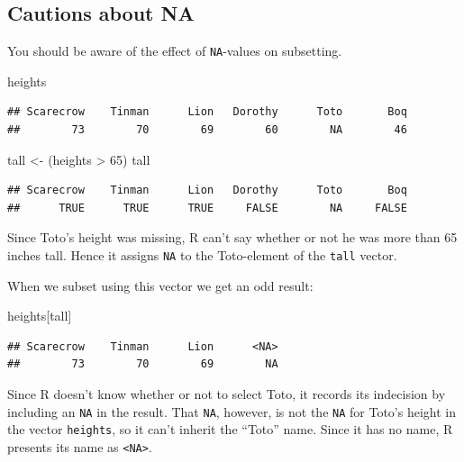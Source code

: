 \documentclass[]{book}
\makeatletter
\newenvironment{Shaded}{\begin{snugshade}}{\end{snugshade}}
\newcommand{\DecValTok}[1]{\textcolor[rgb]{0.00,0.00,0.81}{{#1}}}
\newcommand{\StringTok}[1]{\textcolor[rgb]{0.31,0.60,0.02}{{#1}}}
\newcommand{\NormalTok}[1]{{#1}}
\newenvironment{kframe}{%
\medskip{}
\setlength{\fboxsep}{.8em}
 \def\at@end@of@kframe{}%
 \ifinner\ifhmode%
  \def\at@end@of@kframe{\end{minipage}}%
  \begin{minipage}{\columnwidth}%
 \fi\fi%
 \def\FrameCommand##1{\hskip\@totalleftmargin \hskip-\fboxsep
 \colorbox{shadecolor}{##1}\hskip-\fboxsep
     \hskip-\linewidth \hskip-\@totalleftmargin \hskip\columnwidth}%
 \MakeFramed {\advance\hsize-\width
   \@totalleftmargin\z@ \linewidth\hsize
   \@setminipage}}%
 {\par\unskip\endMakeFramed%
 \at@end@of@kframe}
\renewenvironment{Shaded}{\begin{kframe}}{\end{kframe}}
\theoremstyle{definition}
\theoremstyle{definition}
\theoremstyle{remark}
\makeatother
\begin{document}
\subsection{Cautions about NA}\label{cautions-about-na}

You should be aware of the effect of \texttt{NA}-values on subsetting.

\begin{Shaded}
\begin{Highlighting}[]
\NormalTok{heights}
\end{Highlighting}
\end{Shaded}

\begin{verbatim}
## Scarecrow    Tinman      Lion   Dorothy      Toto       Boq 
##        73        70        69        60        NA        46
\end{verbatim}

\begin{Shaded}
\begin{Highlighting}[]
\NormalTok{tall <-}\StringTok{ }\NormalTok{(heights >}\StringTok{ }\DecValTok{65}\NormalTok{)}
\NormalTok{tall}
\end{Highlighting}
\end{Shaded}

\begin{verbatim}
## Scarecrow    Tinman      Lion   Dorothy      Toto       Boq 
##      TRUE      TRUE      TRUE     FALSE        NA     FALSE
\end{verbatim}

Since Toto's height was missing, R can't say whether or not he was more
than 65 inches tall. Hence it assigns \texttt{NA} to the Toto-element of
the \texttt{tall} vector.

When we subset using this vector we get an odd result:

\begin{Shaded}
\begin{Highlighting}[]
\NormalTok{heights[tall]}
\end{Highlighting}
\end{Shaded}

\begin{verbatim}
## Scarecrow    Tinman      Lion      <NA> 
##        73        70        69        NA
\end{verbatim}

Since R doesn't know whether or not to select Toto, it records its
indecision by including an \texttt{NA} in the result. That \texttt{NA},
however, is not the \texttt{NA} for Toto's height in the vector
\texttt{heights}, so it can't inherit the ``Toto'' name. Since it has no
name, R presents its name as \texttt{\textless{}NA\textgreater{}}.
\end{document}

